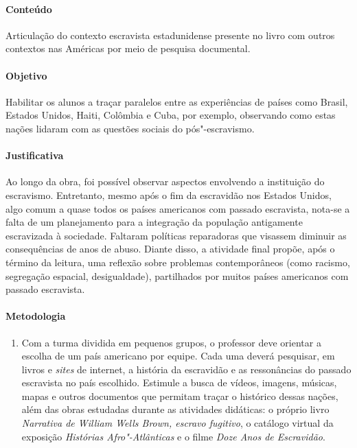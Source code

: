 \documentclass[11pt]{extarticle}
\begin{document}
\begin{enumerate}
 \paragraph{Conteúdo} Articulação do contexto escravista estadunidense presente
 no livro com outros contextos nas Américas por meio de pesquisa documental.

 \paragraph{Objetivo} Habilitar os alunos a traçar paralelos entre as experiências
 de países como Brasil, Estados Unidos, Haiti, Colômbia e Cuba, por exemplo,
 observando como estas nações lidaram com as questões sociais do pós"-escravismo.

 \paragraph{Justificativa} Ao longo da obra, foi possível observar aspectos envolvendo
a instituição do escravismo. Entretanto, mesmo após o fim da escravidão
nos Estados Unidos, algo comum a quase todos os países americanos com
passado escravista, nota-se a falta de um planejamento para a integração
da população antigamente escravizada à sociedade. Faltaram políticas
reparadoras que visassem diminuir as consequências de anos de abuso.
Diante disso, a atividade final propõe, após o término da leitura, uma
reflexão sobre problemas contemporâneos (como racismo, segregação
espacial, desigualdade), partilhados por muitos países americanos com
passado escravista. 

 \paragraph{Metodologia}
   \begin{enumerate}
    \item
    Com a turma dividida em pequenos grupos, o professor deve orientar
    a escolha de um país americano por equipe. Cada uma deverá pesquisar, em livros e
  \emph{sites} de internet, a história da escravidão e as ressonâncias
  do passado escravista no país escolhido. Estimule a busca de vídeos,
  imagens, músicas, mapas e outros documentos que permitam traçar o
  histórico dessas nações, além das obras estudadas durante as atividades 
  didáticas: o próprio livro \emph{Narrativa de William Wells Brown, escravo fugitivo},
  o catálogo virtual da exposição \emph{Histórias Afro"-Atlânticas} e o filme
  \emph{Doze Anos de Escravidão}.


\end{enumerate}
\end{enumerate}
\end{document}
